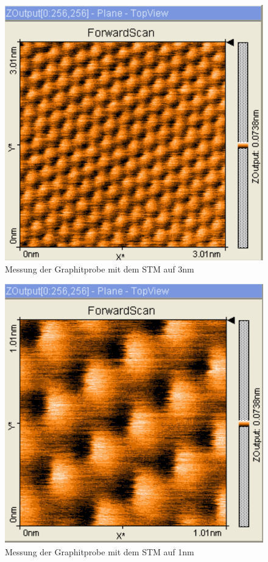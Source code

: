 \documentclass[
	a4paper,
	12pt,
	pagesize,
	ngerman
]{scrartcl}
\begin{document}
\begin{figure}[h!]
	\centering
	\includegraphics[scale=0.4]{Scan.png}
	\caption{Messung der Graphitprobe mit dem STM auf 3nm}
	\label{scan3}
\end{figure}

\begin{figure}[h!]
	\centering
	\includegraphics[scale=0.4]{Scan1.png}
	\caption{Messung der Graphitprobe mit dem STM auf 1nm}
	\label{scan1}
\end{figure}
\newpage
\end{document}
